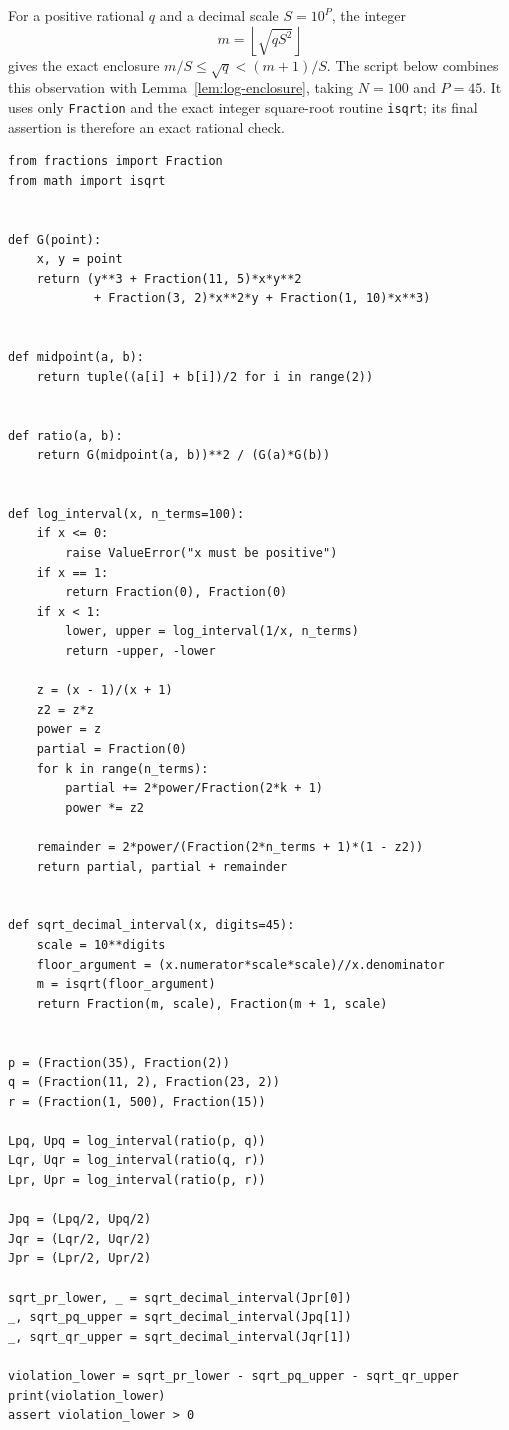 \documentclass[11pt]{article}
\theoremstyle{definition}
\begin{document}
For a positive rational $q$ and a decimal scale $S=10^P$, the integer
\[
 m=\left\lfloor\sqrt{qS^2}\right\rfloor
\]
gives the exact enclosure $m/S\le\sqrt q<(m+1)/S$.  The script below combines this
observation with Lemma~\ref{lem:log-enclosure}, taking $N=100$ and $P=45$.  It uses only
\texttt{Fraction} and the exact integer square-root routine \texttt{isqrt}; its final assertion is
therefore an exact rational check.

\begin{lstlisting}[style=pythonstyle]
from fractions import Fraction
from math import isqrt


def G(point):
    x, y = point
    return (y**3 + Fraction(11, 5)*x*y**2
            + Fraction(3, 2)*x**2*y + Fraction(1, 10)*x**3)


def midpoint(a, b):
    return tuple((a[i] + b[i])/2 for i in range(2))


def ratio(a, b):
    return G(midpoint(a, b))**2 / (G(a)*G(b))


def log_interval(x, n_terms=100):
    if x <= 0:
        raise ValueError("x must be positive")
    if x == 1:
        return Fraction(0), Fraction(0)
    if x < 1:
        lower, upper = log_interval(1/x, n_terms)
        return -upper, -lower

    z = (x - 1)/(x + 1)
    z2 = z*z
    power = z
    partial = Fraction(0)
    for k in range(n_terms):
        partial += 2*power/Fraction(2*k + 1)
        power *= z2

    remainder = 2*power/(Fraction(2*n_terms + 1)*(1 - z2))
    return partial, partial + remainder


def sqrt_decimal_interval(x, digits=45):
    scale = 10**digits
    floor_argument = (x.numerator*scale*scale)//x.denominator
    m = isqrt(floor_argument)
    return Fraction(m, scale), Fraction(m + 1, scale)


p = (Fraction(35), Fraction(2))
q = (Fraction(11, 2), Fraction(23, 2))
r = (Fraction(1, 500), Fraction(15))

Lpq, Upq = log_interval(ratio(p, q))
Lqr, Uqr = log_interval(ratio(q, r))
Lpr, Upr = log_interval(ratio(p, r))

Jpq = (Lpq/2, Upq/2)
Jqr = (Lqr/2, Uqr/2)
Jpr = (Lpr/2, Upr/2)

sqrt_pr_lower, _ = sqrt_decimal_interval(Jpr[0])
_, sqrt_pq_upper = sqrt_decimal_interval(Jpq[1])
_, sqrt_qr_upper = sqrt_decimal_interval(Jqr[1])

violation_lower = sqrt_pr_lower - sqrt_pq_upper - sqrt_qr_upper
print(violation_lower)
assert violation_lower > 0
\end{lstlisting}
\end{document}
